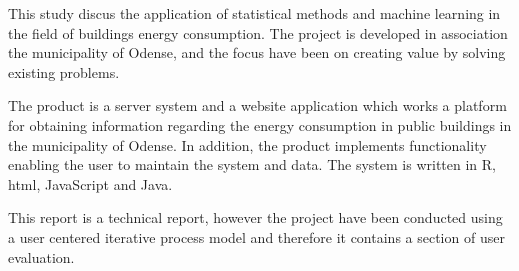 This study discus the application of statistical methods and machine learning in the field of buildings energy consumption. The project is developed in association the municipality of Odense, and the focus have been on creating value by solving existing problems.

The product is a server system and a website application which works a platform for obtaining information regarding the energy consumption in public buildings in the municipality of Odense. In addition, the product implements functionality enabling the user to maintain the system and data. The system is written in R, html, JavaScript and Java.


This report is a technical report, however the project have been conducted using a user centered iterative process model and therefore it contains a section of user evaluation.  
